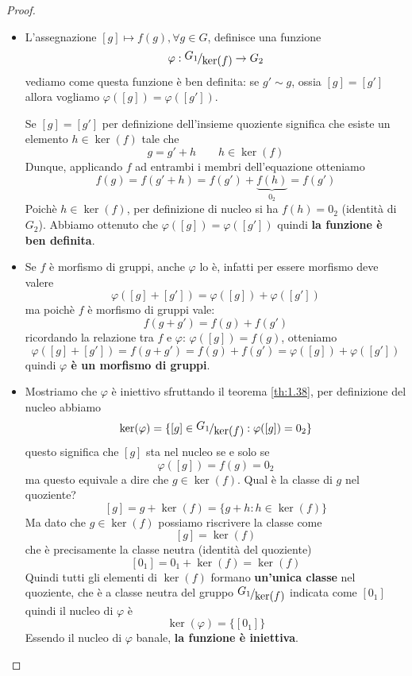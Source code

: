 \documentclass[../main.tex]{subfiles}
\begin{document}
\begin{proof}\
    \begin{itemize}
        \item  L'assegnazione $[g] \mapsto f(g), \forall g \in  G$, definisce una funzione
              \[
                  \varphi : \nicefrac{G_1}{\ker(f)} \rightarrow G_2
              \]
              vediamo come questa funzione è ben definita: se $g' \sim g$, ossia $[g]  = [g']$ allora vogliamo $\varphi([g]) = \varphi([g'])$.

              Se $[g] = [g']$ per definizione dell'insieme quoziente significa che esiste un elemento $h \in \ker(f)$ tale che
              \[
                  g = g' + h \qquad h \in \ker(f)
              \]
              Dunque, applicando $f$ ad entrambi i membri dell'equazione otteniamo
              \[
                  f(g) = f(g' + h) = f(g') + \underbrace{f(h)}_{0_2} = f(g')
              \]
              Poichè $h \in \ker(f)$, per definizione di nucleo si ha $f(h) = 0_2$ (identità di $G_2$). Abbiamo ottenuto che $\varphi([g]) = \varphi([g'])$ quindi \textbf{la funzione è ben definita}.

        \item Se $f$ è morfismo di gruppi, anche $\varphi$ lo è, infatti per essere morfismo deve valere
              \[
                  \varphi([g] + [g']) = \varphi([g]) + \varphi([g'])
              \]
              ma poichè $f$ è morfismo di gruppi vale:
              \[
                  f(g+g') = f(g) + f(g')
              \]
              ricordando la relazione tra $f$ e $\varphi$: $\varphi([g]) = f(g)$, otteniamo
              \[
                  \varphi([g] + [g']) = f(g+g') = f(g) + f(g') = \varphi([g]) + \varphi([g'])
              \]
              quindi \textbf{$\varphi$ è un morfismo di gruppi}.
        \item Mostriamo che $\varphi$ è iniettivo sfruttando il teorema \ref{th:1.38}, per definizione del nucleo abbiamo
              \[
                  \ker(\varphi) = \{[g] \in \nicefrac{G_1}{\ker(f)} : \varphi([g]) = 0_2\}
              \]
              questo significa che $[g]$ sta nel nucleo se e solo se
              \[
                  \varphi([g]) = f(g) = 0_2
              \]
              ma questo equivale a dire che $g \in \ker(f)$. Qual è la classe di $g$ nel quoziente?
              \[
                  [g] = g + \ker (f) = \{g + h : h \in \ker(f)\}
              \]
              Ma dato che $g \in \ker(f)$ possiamo riscrivere la classe come
              \[
                  [g] = \ker(f)
              \]
              che è precisamente la classe neutra (identità del quoziente)
              \[
                  [0_1] = 0_1 + \ker(f) = \ker(f)
              \]
              Quindi tutti gli elementi di $\ker(f)$ formano \textbf{un'unica classe} nel quoziente, che è a classe neutra del gruppo $\nicefrac{G_1}{\ker(f)}$ indicata come $[0_1]$ quindi il nucleo di $\varphi$ è
              \[
                  \ker(\varphi) = \{[0_1]\}
              \]
              Essendo il nucleo di $\varphi$ banale, \textbf{la funzione è iniettiva}.


\end{itemize}
\end{proof}
\end{document}
